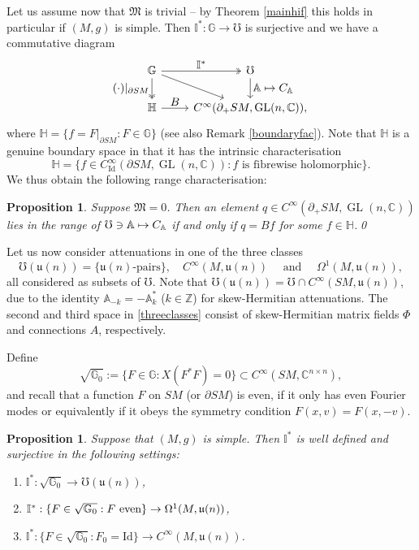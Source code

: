 \documentclass[JEP,XML,SOM,Unicode,published]{cedram}
\newcommand\mto{\mathchoice{\longmapsto}{\mapsto}{\mapsto}{\mapsto}}
\let\ts\textstyle
\DeclareMathOperator{\GL}{GL}
\theoremstyle{plain}
\newtheorem{proposition}[theorem]{Proposition}
\theoremstyle{definition}
\newcommand{\A}{\mathbb{A}}
\newcommand{\G}{\mathbb{G}}
\newcommand{\I}{\mathbb{I}}
\newcommand{\Z}{\mathbb{Z}}
\newcommand{\C}{\mathbb{C}}
\newcommand{\M}{\mathfrak{M}}
\renewcommand{\u}{\mathfrak{u}}
\newcommand{\Id}{\mathrm{Id}}
\newcommand{\1}{{\bf 1}}
\begin{document}
Let us assume now that $\M$ is trivial -- by Theorem \ref{mainhif} this holds in particular if $(M,g)$ is simple.
Then $\I^*:\G\to \mho$ is surjective and we have a commutative diagram
\begin{equation}\label{magicdiagram2}
\begin{tikzcd}
\G \arrow[two heads]{r}{\ts\I^*} \arrow{dr}\arrow[swap, two heads]{d}{\ts(\cdot)\vert_{\partial SM}} & \mho \arrow{d}{\ts\A\mto C_\A} \\
\mathbb{H} \arrow{r}{\ts B} & C^\infty(\partial_+SM,\GL(n,\C)),
\end{tikzcd}
\end{equation}
where $\mathbb{H}=\{f = F\vert_{\partial SM}: F\in \G\}$ (see also Remark \ref{boundaryfac}). Note that $\mathbb{H}$ is a genuine boundary space in that it has the intrinsic characterisation
\begin{equation*}
\mathbb{H}=\{f\in C_\Id^\infty(\partial SM,\GL(n,\C)): f \text{ is fibrewise holomorphic} \}.
\end{equation*}
We thus obtain the following range characterisation:

\begin{proposition}
Suppose $\M=0$. Then an element $q\in C^\infty(\partial_+SM,\GL(n,\C))$ lies in the range of $\mho\ni \A\mto C_\A$ if and only if $q = B f$ for some $f\in \mathbb{H}$.\qed
\end{proposition}

Let us now consider attenuations in one of the three classes
\begin{equation}\label{threeclasses}
\mho(\u(n))=\{\u(n)\text{-pairs}\},\quad C^\infty(M,\u(n))\quad \text{ and } \quad \Omega^1(M,\u(n)),
\end{equation}
all considered as subsets of $\mho$.
Note that $\mho(\u(n)) = \mho \cap C^\infty(SM,\u(n))$, due to the identity $\A_{-k}=-\A_k^*$ ($k\in \Z$) for skew-Hermitian attenuations. The second and third space in \eqref{threeclasses} consist of skew-Hermitian matrix fields $\Phi$ and connections $A$, respectively.

Define
\begin{equation*}
\sqrt{\G_0} := \{F\in \G: X(F^*F)=0\}\subset C^\infty(SM,\C^{n\times n}),
\end{equation*}
and recall that a function $F$ on $SM$ (or $\partial SM$) is even, if it only has even Fourier modes or equivalently if it obeys the symmetry condition $F(x,v)=F(x,-v)$.

\begin{proposition}\label{ionto} Suppose that $(M,g)$ is simple. Then $\I^*$ is well defined and surjective in the following settings:
\begin{enumerate}
\item \label{ionto1} $\I^*:\sqrt{\G_0} \to \mho(\u(n))$,
\item \label{ionto3} $\I^*:\{F\in \sqrt{\G_0}: F \text{ {\rm even}}\} \to \Omega^1(M,\u(n))$,
\item \label{ionto2} $\I^*:\{F\in \sqrt{\G_0}: F_0=\Id\} \to C^\infty(M,\u(n))$.
\end{enumerate}
\end{proposition}
\end{document}
